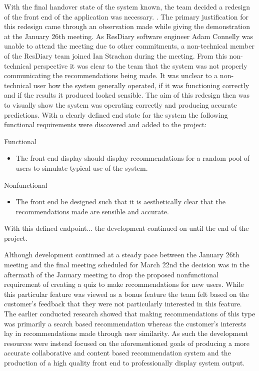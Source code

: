 \documentclass{l3proj}
\begin{document}
With the final handover state of the system known, the team decided a redesign of the front end of the application was necessary. . The primary justification for this redesign came through an observation made while giving the demonstration at the January 26th meeting. As ResDiary software engineer Adam Connelly was unable to attend the meeting due to other commitments, a non-technical member of the ResDiary team joined Ian Strachan during the meeting. From this non-technical perspective it was clear to the team that the system was not properly communicating the recommendations being made. It was unclear to a non-technical user how the system generally operated, if it was functioning correctly and if the results it produced looked sensible. The aim of this redesign then was to visually show the system was operating correctly and producing accurate predictions. With a clearly defined end state for the system the following functional requirements were discovered and added to the project:

Functional
\begin{itemize}
\item The front end display should display recommendations for a random pool of users to simulate typical use of the system.
\end{itemize}

Nonfunctional
\begin{itemize}
\item The front end be designed such that it is aesthetically clear that the recommendations made are sensible and accurate.
\end{itemize}

With this defined endpoint... the development continued on until the end of the project.

Although development continued at a steady pace between the January 26th meeting and the final meeting scheduled for March 22nd the decision was in the aftermath of the January meeting to drop the proposed nonfunctional requirement of creating a quiz to make recommendations for new users. While this particular feature was viewed as a bonus feature the team felt based on the customer’s feedback that they were not particularly interested in this feature. The earlier conducted research showed that making recommendations of this type was primarily a search based recommendation whereas the customer’s interests lay in recommendations made through user similarity. As such the development resources were instead focused on the aforementioned goals of producing a more accurate collaborative and content based recommendation system and the production of a high quality front end to professionally display system output. 
\end{document}

